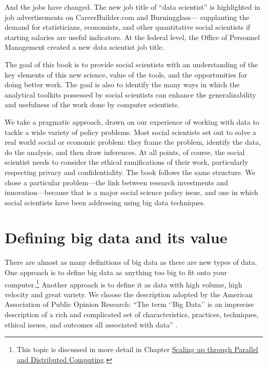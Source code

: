 \documentclass[]{krantz}
\begin{document}
And the jobs have changed. The new job title of ``data scientist'' is
highlighted in job advertisements on CareerBuilder.com and
Burningglass--- supplanting the demand for statisticians, economists,
and other quantitative social scientists if starting salaries are useful
indicators. At the federal level, the Office of Personnel Management
created a new data scientist job title.

The goal of this book is to provide social scientists with an
understanding of the key elements of this new science, value of the
tools, and the opportunities for doing better work. The goal is also to
identify the many ways in which the analytical toolkits possessed by
social scientists can enhance the generalizability and usefulness of the
work done by computer scientists.

We take a pragmatic approach, drawn on our experience of working with
data to tackle a wide variety of policy problems. Most social scientists
set out to solve a real world social or economic problem: they frame the
problem, identify the data, do the analysis, and then draw inferences.
At all points, of course, the social scientist needs to consider the
ethical ramifications of their work, particularly respecting privacy and
confidentiality. The book follows the same structure. We chose a
particular problem---the link between research investments and
innovation---because that is a major social science policy issue, and
one in which social scientists have been addressing using big data
techniques.

\section{Defining big data and its value}\label{sec:1-2}

There are almost as many definitions of big data as there are new types
of data. One approach is to define big data as anything too big to fit
onto your computer.\footnote{This topic is discussed in more detail in
  Chapter \protect\hyperlink{chap:parallel}{Scaling up through Parallel
  and Distributed Computing}.} Another approach is to define it as data
with high volume, high velocity and great variety. We choose the
description adopted by the American Association of Public Opinion
Research: ``The term `'Big Data'' is an imprecise description of a rich
and complicated set of characteristics, practices, techniques, ethical
issues, and outcomes all associated with data'' \citep{japec2015big}.
\end{document}
